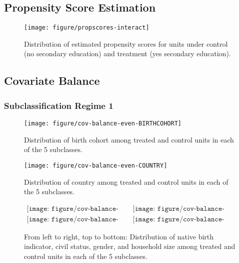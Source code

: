 \documentclass[letterpaper,11pt]{article}
\begin{document}
\clearpage{}


\subsection{Propensity Score Estimation}

\begin{figure}[htb]
\centering \texttt{[image: figure/propscores-interact]} \protect\caption{Distribution of estimated propensity scores for units under control (no secondary
education) and treatment (yes secondary education).}


\label{fig:propscore} 
\end{figure}


\clearpage{}


\subsection{Covariate Balance}


\subsubsection{Subclassification Regime 1}

\begin{figure}[htb]
\centering \texttt{[image: figure/cov-balance-even-BIRTHCOHORT]}
\protect\caption{Distribution of birth cohort among treated and control units in each of the 5 subclasses.}


\label{fig:cov-balance-even-birthcohort} 
\end{figure}


\begin{figure}[htb]
\centering \texttt{[image: figure/cov-balance-even-COUNTRY]}
\protect\caption{Distribution of country among treated and control units in each of the 5 subclasses.}


\label{fig:cov-balance-even-country} 
\end{figure}


\begin{figure}[htb]
\begin{centering}
$\begin{array}{cc}
\texttt{[image: figure/cov-balance-even-BORN.pdf]} & \texttt{[image: figure/cov-balance-even-CIVIL.pdf]}\\
\texttt{[image: figure/cov-balance-even-GENDER.pdf]} & \texttt{[image: figure/cov-balance-even-HHSIZE.pdf]}
\end{array}$ 
\par\end{centering}

\protect\caption{From left to right, top to bottom: Distribution of native birth indicator, civil
status, gender, and household size among treated and control units in each of the
5 subclasses.}


\label{fig:cov-even1} 
\end{figure}
\end{document}
